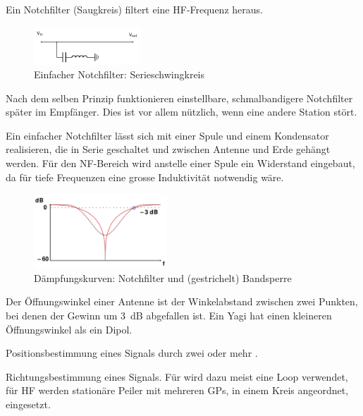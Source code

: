 {}

{Ein Notchfilter (Saugkreis) filtert eine HF-Frequenz heraus.

\begin{figure}[h!]
 \centering
 \includegraphics[width=4cm]{./png/Amfu-Schema-Notchfilter.png}
 \caption{Einfacher Notchfilter: Serieschwingkreis}
 \label{fig:notchfilter}
\end{figure}

Nach dem selben Prinzip funktionieren einstellbare, schmalbandigere Notchfilter später im Empfänger. Dies ist vor allem nützlich, wenn eine andere Station stört.

Ein einfacher Notchfilter lässt sich mit einer Spule und einem Kondensator realisieren, die in Serie geschaltet und zwischen Antenne und Erde gehängt werden. Für den NF-Bereich wird anstelle einer Spule ein Widerstand eingebaut, da für tiefe Frequenzen eine grosse Induktivität notwendig wäre.

\begin{figure}[h!]
 \centering
 \includegraphics[width=5cm]{./png/Amfu-Notchfilter.png}
 \caption{Dämpfungskurven: Notchfilter und 
(gestrichelt) Bandsperre}
 \label{fig:notchfilterFreq}
\end{figure}
}

{Der Öffnungswinkel einer Antenne ist der Winkelabstand zwischen zwei Punkten, bei denen der Gewinn um 3 dB abgefallen ist. Ein Yagi hat einen kleineren Öffnungswinkel als ein Dipol.}

{Positionsbestimmung eines Signals durch zwei oder mehr .}

{Richtungsbestimmung eines Signals. Für  wird dazu meist eine Loop verwendet, für HF werden stationäre Peiler mit mehreren GPs, in einem Kreis angeordnet, eingesetzt.}

